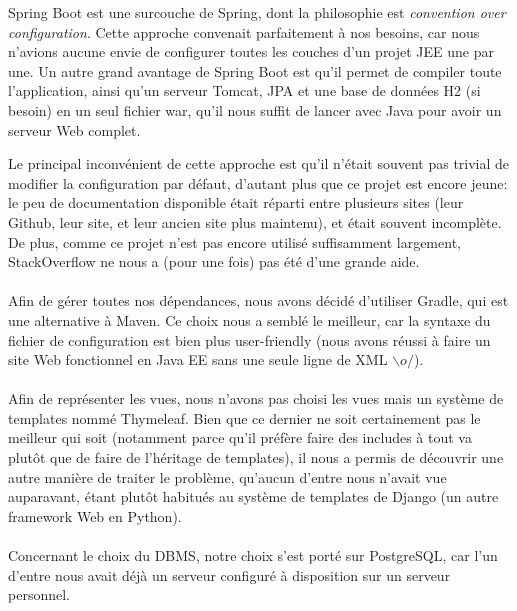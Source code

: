\documentclass[10pt]{scrartcl}
\begin{document}
  Spring Boot est une surcouche de Spring, dont la philosophie est
  \emph{convention over configuration}. Cette approche convenait
  parfaitement à nos besoins, car nous n'avions aucune envie de
  configurer toutes les couches d'un projet JEE une par une. Un autre
  grand avantage de Spring Boot est qu'il permet de compiler toute
  l'application, ainsi qu'un serveur Tomcat, JPA et une base de
  données H2 (si besoin) en un seul fichier war, qu'il nous suffit de
  lancer avec Java pour avoir un serveur Web complet.

  Le principal inconvénient de cette approche est qu'il n'était
  souvent pas trivial de modifier la configuration par défaut,
  d'autant plus que ce projet est encore jeune: le peu de
  documentation disponible était réparti entre plusieurs sites (leur
  Github, leur site, et leur ancien site plus maintenu), et était
  souvent incomplète. De plus, comme ce projet n'est pas encore
  utilisé suffisamment largement, StackOverflow ne nous a (pour une
  fois) pas été d'une grande aide.

  \paragraph{}
  Afin de gérer toutes nos dépendances, nous avons décidé d'utiliser
  Gradle, qui est une alternative à Maven. Ce choix nous a semblé le
  meilleur, car la syntaxe du fichier de configuration est bien plus
  user-friendly (nous avons réussi à faire un site Web fonctionnel en
  Java EE sans une seule ligne de XML $\backslash o/$).

  \paragraph{}
  Afin de représenter les vues, nous n'avons pas choisi les vues
  mais un système de templates nommé Thymeleaf. Bien que ce dernier
  ne soit certainement pas le meilleur qui soit (notamment parce
  qu'il préfère faire des includes à tout va plutôt que de faire de
  l'héritage de templates), il nous a permis de découvrir une autre
  manière de traiter le problème, qu'aucun d'entre nous n'avait vue
  auparavant, étant plutôt habitués au système de templates de Django
  (un autre framework Web en Python).

  \paragraph{}
  Concernant le choix du DBMS, notre choix s'est porté sur
  PostgreSQL, car l'un d'entre nous avait déjà un serveur configuré à
  disposition sur un serveur personnel.
\end{document}
